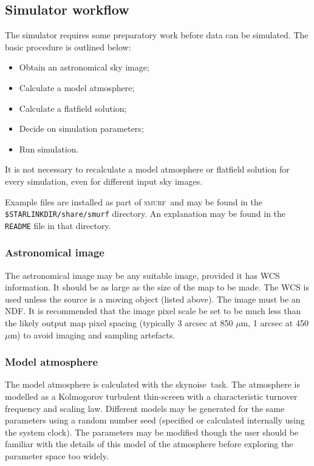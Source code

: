 \documentclass[twoside,11pt]{article}
\newcommand{\xref}[3]{#1}
\newcommand{\xlabel}[1]{}
\renewcommand{\_}{\texttt{\symbol{95}}}
\newcommand{\SMURF}{\textsc{smurf}}
\newcommand{\task}[1]{\textsf{#1}}
\newcommand{\skynoise}{\xref{\task{skynoise}}{sun258}{SKYNOISE}}
\begin{document}
\subsection{\xlabel{simuse}Simulator workflow\label{se:simuse}}

The simulator requires some preparatory work before data can be
simulated. The basic procedure is outlined below:
\begin{itemize}
\item Obtain an astronomical sky image;
\item Calculate a model atmosphere;
\item Calculate a flatfield solution;
\item Decide on simulation parameters;
\item Run simulation.
\end{itemize}
It is not necessary to recalculate a model atmosphere or flatfield
solution for every simulation, even for different input sky images.

Example files are installed as part of \SMURF\ and may be found in the
\texttt{\$STARLINK\_DIR/share/smurf} directory. An explanation may be
found in the \texttt{README} file in that directory.

\subsubsection{Astronomical image}

The astronomical image may be any suitable image, provided it has WCS
information. It should be as large as the size of the map to be
made. The WCS is used unless the source is a moving object (listed
above). The image must be an NDF. It is recommended that the image
pixel scale be set to be much less than the likely output map pixel
spacing (typically 3 arcsec at 850 $\mu$m, 1 arcsec at 450 $\mu$m) to
avoid imaging and sampling artefacts.

\subsubsection{Model atmosphere}

The model atmosphere is calculated with the \skynoise\ task. The
atmosphere is modelled as a Kolmogorov turbulent thin-screen
\cite{sc2ana002} with a characteristic turnover frequency and scaling
law. Different models may be generated for the same parameters using a
random number seed (specified or calculated internally using the
system clock). The parameters may be modified though the user should
be familiar with the details of this model of the atmosphere before
exploring the parameter space too widely.
\end{document}
